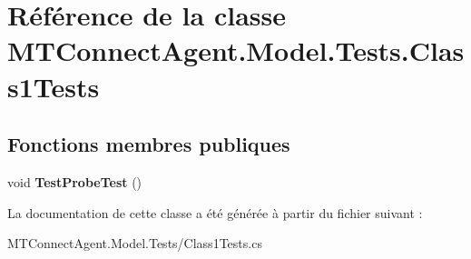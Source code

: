 \hypertarget{class_m_t_connect_agent_1_1_model_1_1_tests_1_1_class1_tests}{}\section{Référence de la classe M\+T\+Connect\+Agent.\+Model.\+Tests.\+Class1\+Tests}
\label{class_m_t_connect_agent_1_1_model_1_1_tests_1_1_class1_tests}
\subsection*{Fonctions membres publiques}
\begin{DoxyCompactItemize}
\item 
\mbox{\label{class_m_t_connect_agent_1_1_model_1_1_tests_1_1_class1_tests_ab2f1a61846162aa0094fecb273232c34}} 
void {\bfseries Test\+Probe\+Test} ()
\end{DoxyCompactItemize}


La documentation de cette classe a été générée à partir du fichier suivant \+:\begin{DoxyCompactItemize}
\item 
M\+T\+Connect\+Agent.\+Model.\+Tests/Class1\+Tests.\+cs\end{DoxyCompactItemize}
